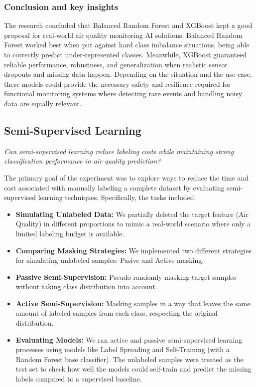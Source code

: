 \documentclass[a4paper,12pt]{article}
\begin{document}
	\subsubsection{Conclusion and key insights}
	The research concluded that Balanced Random Forest and XGBoost kept a good proposal for real-world air quality monitoring AI solutions. 
	Balanced Random Forest worked best when put against hard class imbalance situations, being able to correctly predict under-represented classes. 
	Meanwhile, XGBoost guaranteed reliable performance, robustness, and generalization when realistic sensor dropouts and missing data happen. Depending on the situation and the use case, these models could provide the necessary safety and resilience required for functional monitoring systems where detecting rare events and handling noisy data are equally relevant.
	
	
	
	\subsection{Semi-Supervised Learning}
	
	\textit{Can semi-supervised learning reduce labeling costs while maintaining strong classification performance in air quality prediction?}
	
	
	The primary goal of the experiment was to explore ways to reduce the time and cost associated with manually labeling a complete dataset by evaluating semi-supervised learning techniques. Specifically, the tasks included:
	\begin{itemize}
		\item \textbf{Simulating Unlabeled Data:} We partially deleted the target feature (Air Quality) in different proportions to mimic a real-world scenario where only a limited labeling budget is available.
		
		\item \textbf{Comparing Masking Strategies:} We implemented two different strategies for simulating unlabeled samples: Pasive and Active masking.
		
		\item \textbf{Passive Semi-Supervision:} Pseudo-randomly masking target samples without taking class distribution into account.
		
		\item \textbf{Active Semi-Supervision:} Masking samples in a way that leaves the same amount of labeled samples from each class, respecting the original distribution.
		
		\item \textbf{Evaluating Models:} We ran active and passive semi-supervised learning processes using models like Label Spreading and Self-Training (with a Random Forest base classifier). The unlabeled samples were treated as the test set to check how well the models could self-train and predict the missing labels compared to a supervised baseline.
	\end{itemize}
	
\end{document}
